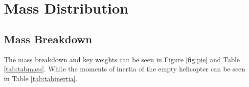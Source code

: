 \documentclass[11pt,a4paper]{article}
\begin{document}

\section{Mass Distribution}
\subsection{Mass Breakdown}
The mass breakdown and key weights can be seen in Figure \ref{fig:pie} and Table \ref{tab:tabmass}. While the moments of inertia of the empty helicopter can be seen in Table \ref{tab:tabinertia}.
\end{document}
